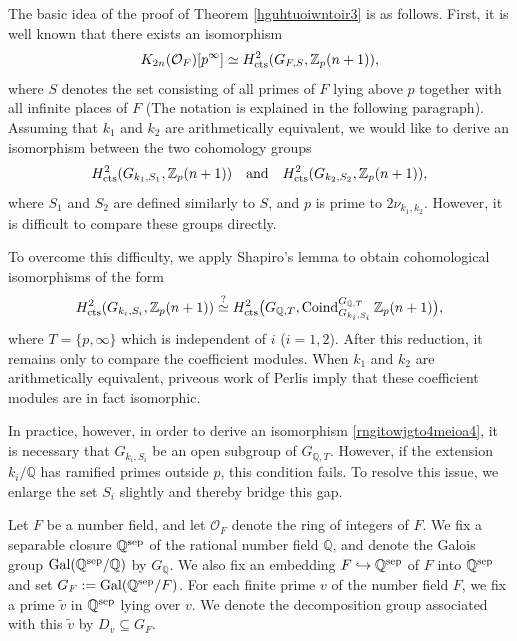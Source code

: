 \documentclass{article}
\numberwithin{equation}{section} %
\begin{document}
The basic idea of the proof of Theorem \ref{hguhtuoiwntoir3} is as follows. First, it is well known that there exists an isomorphism
\[
 K_{2n}(\mathcal{O}_F)[p^\infty]
\simeq
H^2_{\rm cts}(G_{F,S},\mathbb{Z}_p(n+1)),
\]
where $S$ denotes the set consisting of all primes of $F$ lying above $p$ together with all infinite places of $F$ (The notation is explained in the following paragraph). Assuming that $k_1$ and $k_2$ are arithmetically equivalent, we would like to derive an isomorphism between the two cohomology groups
\[
H^2_{\rm cts}(G_{k_1,S_1},\mathbb{Z}_p(n+1))
\quad \text{and} \quad
H^2_{\rm cts}(G_{k_2,S_2},\mathbb{Z}_p(n+1)),
\]
where $S_1$ and $S_2$ are defined similarly to $S$, and $p$ is prime to $2\nu_{k_1,k_2}$. However, it is difficult to compare these groups directly.

 To overcome this difficulty, we apply Shapiro’s lemma to obtain cohomological isomorphisms of the form
\begin{equation}
\label{rngitowjgto4meioa4}
H^2_{\rm cts}(G_{k_i,S_i},\mathbb{Z}_p(n+1))
\overset{?}{\simeq}
H^2_{\rm cts}\bigl(G_{\mathbb{Q},T},
\operatorname{Coind}_{G_{k_i,S_i}}^{G_{\mathbb{Q},T}}
\mathbb{Z}_p(n+1)\bigr),
\end{equation}
where $T = \{p,\infty\}$ which is independent of $i$ ($i=1,2$). After this reduction, it remains only to compare the coefficient modules. When $k_1$ and $k_2$ are arithmetically equivalent, priveous work of Perlis imply that these coefficient modules are in fact isomorphic.

In practice, however, in order to derive an isomorphism \eqref{rngitowjgto4meioa4}, it is necessary that $G_{k_i,S_i}$ be an open subgroup of $G_{\mathbb{Q},T}$. However, if the extension $k_i/\mathbb{Q}$ has ramified primes outside $p$, this condition fails. To resolve this issue, we enlarge the set $S_i$ slightly and thereby bridge this gap.


  Let $F$ be a number field, and let $\mathcal{O}_F$ denote the ring of integers of $F$. We fix a separable closure $\mathbb{Q}^{\rm sep}$ of the rational number field $\mathbb{Q}$, and denote the Galois group $\operatorname{Gal}(\mathbb{Q}^{\rm sep}/\mathbb{Q})$ by $G_{\mathbb{Q}}$. We also fix an embedding $F \hookrightarrow \mathbb{Q}^{\rm sep}$ of $F$ into $\mathbb{Q}^{\rm sep}$ and set $G_F := \operatorname{Gal}(\mathbb{Q}^{\rm sep}/F)$. For each finite prime $v$ of the number field $F$, we fix a prime $\widetilde{v}$ in $\mathbb{Q}^{\rm sep}$ lying over $v$. We denote the decomposition group associated with this $\widetilde{v}$ by $D_{v} \subseteq G_F$. 
\end{document}
